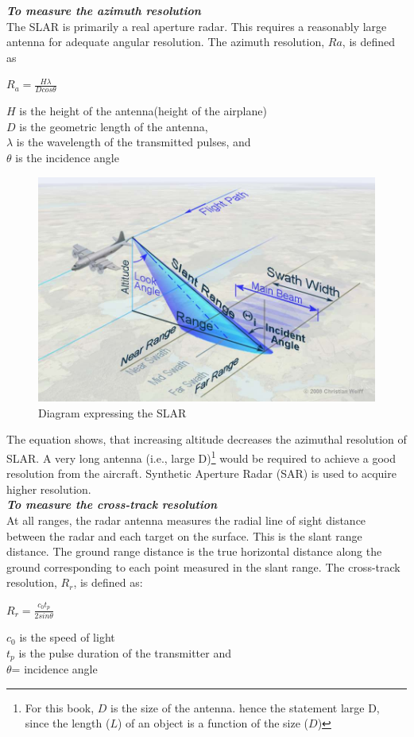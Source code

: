 \textbf{\textit{To measure the azimuth resolution}}\\
The SLAR is primarily a real aperture radar. This requires a reasonably large antenna for adequate angular resolution. The azimuth resolution, $ Ra $, is defined as
\begin{center}
$R_{a}=\frac{H \lambda}{D cos\theta}$
\end{center}
$ H $ is the height of the antenna(height of the airplane)\\
$ D $ is the geometric length of the antenna,\\
$\lambda$ is the wavelength of the transmitted pulses, and\\
$\theta$ is the incidence angle
\begin{figure}[h]
\centering
\includegraphics[scale=0.2]{./graphics/SLAR2}
\caption{Diagram expressing the SLAR}
\end{figure}

The equation shows, that increasing altitude decreases the azimuthal resolution of SLAR. A very long antenna (i.e., large D)\footnote{For this book, $D$ is the size of the antenna. hence the statement \textquotesingle\textquotesingle large D\textquotesingle\textquotesingle, since the length ($L$) of an object is a function of the size ($D$)} would be required to achieve a good resolution from the aircraft. Synthetic Aperture Radar (SAR) is used to acquire higher resolution.\\

\textit{\textbf{To measure the cross-track resolution }}\\
At all ranges, the radar antenna measures the radial line of sight distance between the radar and each target on the surface. This is the slant range distance. The ground range distance is the true horizontal distance along the ground corresponding to each point measured in the slant range. The cross-track resolution, $R_{r}$, is defined as:  
\begin{center}
$R_{r}=\frac{c_{0} t_{p}}{2 sin\theta}$
\end{center}
$c_{0}$ is the speed of light\\
$t_{p}$ is the pulse duration of the transmitter and\\
$\theta$= incidence angle

